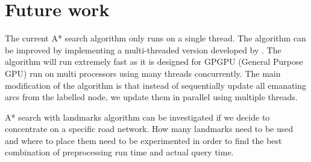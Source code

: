 \section{Future work}
The current A* search algorithm only runs on a single thread.
The algorithm can be improved by implementing a multi-threaded version developed
by \citet{Inam}.
The algorithm will run extremely fast as it is designed for GPGPU (General Purpose GPU) run on multi processors using many threads concurrently.
The main modification of the algorithm is that  
instead of sequentially update all emanating arcs from the labelled node,
we update them in parallel using multiple threads.

A* search with landmarks algorithm can be investigated
if we decide to concentrate on a specific road network.
How many landmarks need to be used and where to place them need to be experimented in order to find the best combination of preprocessing run time and actual query time.


